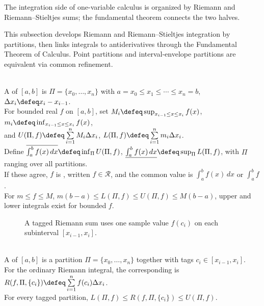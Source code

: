 The integration side of one-variable calculus is organized by Riemann and Riemann--Stieltjes sums; the fundamental theorem connects the two halves.

This subsection develops Riemann and Riemann--Stieltjes integration by partitions, then links integrals to antiderivatives through the Fundamental Theorem of Calculus. Point partitions and interval-envelope partitions are equivalent via common refinement.

\begin{definition} \label{def:partition-and-riemann-upper-lower-sums}\label{def:riemann-stieltjes-core-source-todo} \\
A  of $[a,b]$ is $\Pi=\{x_0,\ldots,x_n\}$ with $a=x_0\leq x_1\leq\cdots\leq x_n=b$, $\Delta x_i\defeq x_i-x_{i-1}$.\\
For bounded real $f$ on $[a,b]$, set $M_i\defeq\sup_{x_{i-1}\leq x\leq x_i}f(x)$, $m_i\defeq\inf_{x_{i-1}\leq x\leq x_i}f(x)$,\\
and $U(\Pi,f)\defeq\sum\limits_{i=1}^{n}M_i\Delta x_i$, $L(\Pi,f)\defeq\sum\limits_{i=1}^{n}m_i\Delta x_i$.\\
Define $\overline{\int_a^b f(x)\,dx}\defeq\inf_\Pi U(\Pi,f)$, $\underline{\int_a^b f(x)\,dx}\defeq\sup_\Pi L(\Pi,f)$, with $\Pi$ ranging over all partitions.\\
If these agree, $f$ is , written $f\in\mathcal{R}$, and the common value is $\int_a^b f(x)\,dx$ or $\int_a^b f$.\\
For $m\leq f\leq M$, $m(b-a)\leq L(\Pi,f)\leq U(\Pi,f)\leq M(b-a)$, upper and lower integrals exist for bounded $f$.
\end{definition}

\begin{figure}[H]
  \centering
  
  \caption{A tagged Riemann sum uses one sample value $f(c_i)$ on each subinterval $[x_{i-1},x_i]$.}
  \label{fig:riemann-tagged-sum}
\end{figure}

\begin{definition} \label{def:tagged-partitions-and-riemann-sums} \\
A  of $[a,b]$ is a partition $\Pi=\{x_0,\ldots,x_n\}$ together with tags $c_i\in[x_{i-1},x_i]$.\\
For the ordinary Riemann integral, the corresponding  is $R(f,\Pi,\{c_i\})\defeq\sum\limits_{i=1}^{n}f(c_i)\Delta x_i$.\\
For every tagged partition, $L(\Pi,f)\leq R(f,\Pi,\{c_i\})\leq U(\Pi,f)$.
\end{definition}

